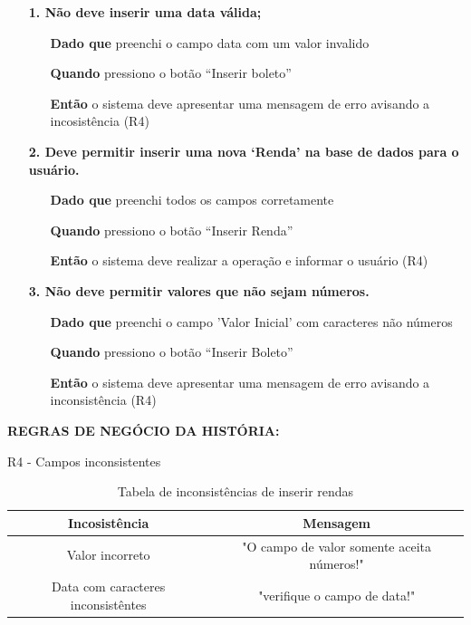 \begin{itemize}
    \item[] \textbf{1. Não deve inserir uma data válida;}

    \begin{itemize}
        \item[\textbf{Dado que}] preenchi o campo data com um valor invalido
        \item[\textbf{Quando}] pressiono o botão ``Inserir boleto''
        \item[\textbf{Então}] o sistema deve apresentar uma mensagem de erro avisando a incosistência (R4)
    \end{itemize}

    \item[] \textbf{2. Deve permitir inserir uma nova ‘Renda’ na base de dados para o
usuário.}

    \begin{itemize}
        \item[\textbf{Dado que}] preenchi todos os campos corretamente
        \item[\textbf{Quando}] pressiono o botão ``Inserir Renda''
        \item[\textbf{Então}] o sistema deve realizar a operação e informar o usuário (R4)
    \end{itemize}

    \item[] \textbf{3. Não deve permitir valores que não sejam números.}

    \begin{itemize}
        \item[\textbf{Dado que}] preenchi o campo 'Valor Inicial' com caracteres não números
        \item[\textbf{Quando}] pressiono o botão ``Inserir Boleto''
        \item[\textbf{Então}]  o sistema deve apresentar uma mensagem de erro avisando a inconsistência (R4)
    \end{itemize}

    
\end{itemize}

\textbf{REGRAS DE NEGÓCIO DA HISTÓRIA:}

    R4 - Campos inconsistentes

    \begin{table}[htb]
        \caption{Tabela de inconsistências de inserir rendas}
        \centering
        \begin{tabular}{|c|c|}
        \hline
          \textbf{Incosistência}   &  \textbf{Mensagem} \\
        \hline
        Valor incorreto   & "O campo de valor somente aceita números!" \\
        \hline
        Data com caracteres inconsistêntes   & "verifique o campo de data!"  \\
        \hline
        \end{tabular}
        \label{tab:tabela_renda_inss }
    \end{table}


